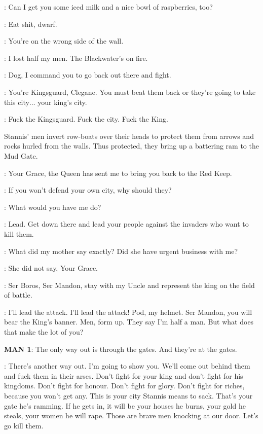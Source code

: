 \TYRION: Can I get you some iced milk and a nice bowl of raspberries, too? 

\HOUND: Eat shit, dwarf. 

\TYRION: You're on the wrong side of the wall. 

\HOUND: I lost half my men. The Blackwater's on fire. 

\JOFFREY:  Dog, I command you to go back out there and fight. 

\TYRION: You're Kingsguard, Clegane. You must beat them back or they're going to take this city$\ldots$ your king's city. 

\HOUND: Fuck the Kingsguard. Fuck the city. Fuck the King. 

\n Stannis' men invert row-boats over their heads to protect them from arrows and rocks hurled from the walls. Thus protected, they bring up a battering ram to the Mud Gate.


\LANCEL: Your Grace, the Queen has sent me to bring you back to the Red Keep. 

\TYRION: If you won't defend your own city, why should they? 

\JOFFREY: What would you have me do? 

\TYRION: Lead. Get down there and lead your people against the invaders who want to kill them. 

\JOFFREY: What did my mother say exactly? Did she have urgent business with me? 

\LANCEL: She did not say, Your Grace. 

\JOFFREY: Ser Boros, Ser Mandon, stay with my Uncle and represent the king on the field of battle. 


\TYRION:  I'll lead the attack.  I'll lead the attack! Pod, my helmet. Ser Mandon, you will bear the King's banner. Men, form up. They say I'm half a man. But what does that make the lot of you? 

\textbf{MAN 1}: The only way out is through the gates. And they're at the gates. 

\TYRION: There's another way out. I'm going to show you. We'll come out behind them and fuck them in their arses.  Don't fight for your king and don't fight for his kingdoms.  Don't fight for honour.  Don't fight for glory.  Don't fight for riches, because you won't get any.  This is your city Stannis means to sack.  That's your gate he's ramming.  If he gets in, it will be your houses he burns, your gold he steals, your women he will rape.  Those are brave men knocking at our door.  Let's go kill them.

